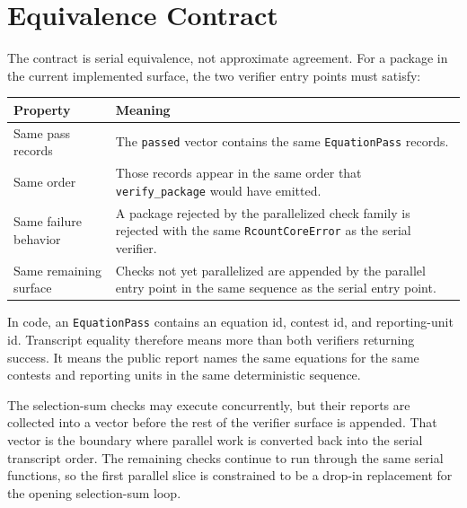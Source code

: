 \section{Equivalence Contract}

The contract is serial equivalence, not approximate agreement. For a package in
the current implemented surface, the two verifier entry points must satisfy:

\begin{center}
\small
\begin{tabularx}{\textwidth}{lX}
\toprule
Property & Meaning \\
\midrule
Same pass records & The \texttt{passed} vector contains the same
\texttt{EquationPass} records. \\
Same order & Those records appear in the same order that
\texttt{verify\_package} would have emitted. \\
Same failure behavior & A package rejected by the parallelized check family is
rejected with the same \texttt{RcountCoreError} as the serial verifier. \\
Same remaining surface & Checks not yet parallelized are appended by the
parallel entry point in the same sequence as the serial entry point. \\
\bottomrule
\end{tabularx}
\end{center}

In code, an \texttt{EquationPass} contains an equation id, contest id, and
reporting-unit id. Transcript equality therefore means more than both verifiers
returning success. It means the public report names the same equations for the
same contests and reporting units in the same deterministic sequence.

The selection-sum checks may execute concurrently, but their reports are
collected into a vector before the rest of the verifier surface is appended.
That vector is the boundary where parallel work is converted back into the
serial transcript order. The remaining checks continue to run through the same
serial functions, so the first parallel slice is constrained to be a drop-in
replacement for the opening selection-sum loop.
